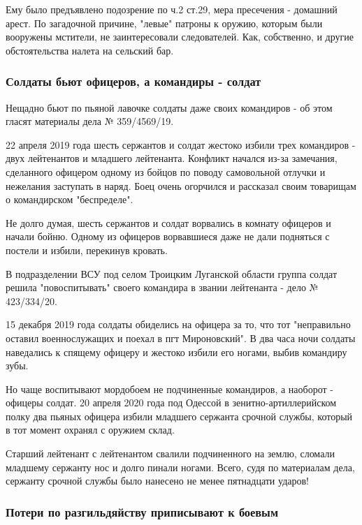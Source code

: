 Ему было предъявлено подозрение по ч.2 ст.29, мера пресечения - домашний арест.
По загадочной причине, "левые" патроны к оружию, которым были вооружены
мстители, не заинтересовали следователей. Как, собственно, и другие
обстоятельства налета на сельский бар.

\subsubsection{Солдаты бьют офицеров, а командиры - солдат}

Нещадно бьют по пьяной лавочке солдаты даже своих командиров - об этом гласят
материалы дела № 359/4569/19.

22 апреля 2019 года шесть сержантов и солдат жестоко избили трех командиров -
двух лейтенантов и младшего лейтенанта. Конфликт начался из-за замечания,
сделанного офицером одному из бойцов по поводу самовольной отлучки и нежелания
заступать в наряд. Боец очень огорчился и рассказал своим товарищам о
командирском "беспределе".

Не долго думая, шесть сержантов и солдат ворвались в комнату офицеров и начали
бойню. Одному из офицеров ворвавшиеся даже не дали подняться с постели и
избили, перекинув кровать.

В подразделении ВСУ под селом Троицким Луганской области группа солдат решила
"повоспитывать" своего командира в звании лейтенанта - дело № 423/334/20.

15 декабря 2019 года солдаты обиделись на офицера за то, что тот "неправильно
оставил военнослужащих и поехал в пгт Мироновский". В два часа ночи солдаты
наведались к спящему офицеру и жестоко избили его ногами, выбив командиру зубы.

Но чаще воспитывают мордобоем не подчиненные командиров, а наоборот - офицеры
солдат. 20 апреля 2020 года под Одессой в зенитно-артиллерийском полку два
пьяных офицера избили младшего сержанта срочной службы, который в тот момент
охранял с оружием склад.

Старший лейтенант с лейтенантом свалили подчиненного на землю, сломали младшему
сержанту нос и долго пинали ногами. Всего, судя по материалам дела, сержанту
срочной службы было нанесено не менее пятнадцати ударов!

\subsubsection{Потери по разгильдяйству приписывают к боевым }

